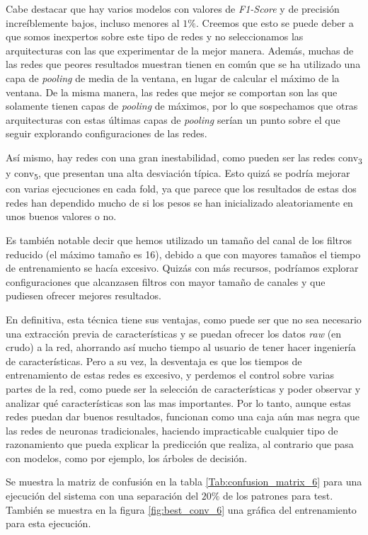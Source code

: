 \documentclass[12pt]{article}
\begin{document}
\bigskip
Cabe destacar que hay varios modelos con valores de \textit{F1-Score} y de precisión increíblemente bajos,
incluso menores al $1\%$. Creemos que esto se puede deber a que somos inexpertos sobre este tipo de redes
y no seleccionamos las arquitecturas con las que experimentar de la mejor manera. Además, muchas de las
redes que peores resultados muestran tienen en común que se ha utilizado una capa de \textit{pooling} de media
de la ventana, en lugar de calcular el máximo de la ventana. De la misma manera, las redes que mejor se comportan
son las que solamente tienen capas de \textit{pooling} de máximos, por lo que sospechamos que otras arquitecturas
con estas últimas capas de \textit{pooling} serían un punto sobre el que seguir explorando configuraciones de las redes.

\bigskip
Así mismo, hay redes con una gran inestabilidad, como pueden ser las redes conv\textsubscript{3} y
conv\textsubscript{5}, que presentan una alta desviación típica. Esto quizá se podría mejorar con
varias ejecuciones en cada fold, ya que parece que los resultados de estas dos redes han dependido
mucho de si los pesos se han inicializado aleatoriamente en unos buenos valores o no.

\bigskip
Es también notable decir que hemos utilizado un tamaño del canal de los filtros reducido (el máximo tamaño es 16),
debido a que con mayores tamaños el tiempo de entrenamiento se hacía excesivo. Quizás con más recursos,
podríamos explorar configuraciones que alcanzasen filtros con mayor tamaño de canales y que pudiesen
ofrecer mejores resultados.

\bigskip
En definitiva, esta técnica tiene sus ventajas, como puede ser que no sea necesario una extracción previa
de características y se puedan ofrecer los datos \textit{raw} (en crudo) a la red, ahorrando así mucho tiempo
al usuario de tener hacer ingeniería de características. Pero a su vez, la desventaja es que los tiempos de entrenamiento
de estas redes es excesivo, y perdemos el control sobre varias partes de la red, como puede ser la selección de
características y poder observar y analizar qué características son las mas importantes. Por lo tanto,
aunque estas redes puedan dar buenos resultados, funcionan como una caja aún mas negra que las redes de neuronas
tradicionales, haciendo impracticable cualquier tipo de razonamiento que pueda explicar la predicción que realiza,
al contrario que pasa con modelos, como por ejemplo, los árboles de decisión.

\bigskip
Se muestra la matriz de confusión en la tabla \ref{Tab:confusion_matrix_6} para una ejecución del sistema
con una separación del $20\%$ de los patrones para test. También se muestra en la figura
\ref{fig:best_conv_6} una gráfica del entrenamiento para esta ejecución.
\end{document}
